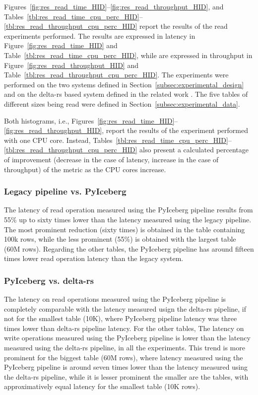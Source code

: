 Figures~\ref{fig:res_read_time_HID}--\ref{fig:res_read_throughput_HID}, and Tables~\ref{tbl:res_read_time_cpu_perc_HID}--\ref{tbl:res_read_throughput_cpu_perc_HID} report the results of the read experiments performed. The results are expressed in latency in Figure~\ref{fig:res_read_time_HID} and Table~\ref{tbl:res_read_time_cpu_perc_HID}, while are expressed in throughput in Figure~\ref{fig:res_read_throughput_HID} and Table~\ref{tbl:res_read_throughput_cpu_perc_HID}. The experiments were performed on the two systems defined in Section~\ref{subsec:experimental_design} and on the delta-rs based system defined in the related work \cite{manfrediReducingReadWrite2024}. The five tables of different sizes being read were defined in Section~\ref{subsec:experimental_data}.

Both histograms, i.e., Figures~\ref{fig:res_read_time_HID}--\ref{fig:res_read_throughput_HID}, report the results of the experiment performed with one \gls{CPU} core. Instead, Tables~\ref{tbl:res_read_time_cpu_perc_HID}--\ref{tbl:res_read_throughput_cpu_perc_HID} also present a calculated percentage of improvement (decrease in the case of latency, increase in the case of throughput) of the metric as the \gls{CPU} cores increase.

\subsubsection*{Legacy pipeline vs. PyIceberg}
The latency of read operation measured using the PyIceberg pipeline results from 55\% up to sixty times lower than the latency measured using the legacy pipeline. The most prominent reduction  (sixty times) is obtained in the table containing 100k rows, while the less prominent (55\%) is obtained with the largest table (60M rows). Regarding the other tables, the PyIceberg pipeline has around fifteen times lower read operation latency than the legacy system.

\subsubsection*{PyIceberg vs. delta-rs}
The latency on read operations measured using the PyIceberg pipeline is completely comparable with the latency measured usign the delta-rs pipeline, if not for the smallest table (10K), where PyIceberg pipeline latency was three times lower than delta-rs pipeline latency. For the other tables,
The latency on write operations measured using the PyIceberg pipeline is lower than the latency measured using the delta-rs pipeline, in all the experiments. This trend is more prominent for the biggest table (60M rows), where latency measured using the PyIceberg pipeline is around seven times lower than the latency measured using the delta-rs pipeline, while it is lesser prominent the smaller are the tables, with approximatively equal latency for the smallest table (10K rows).

